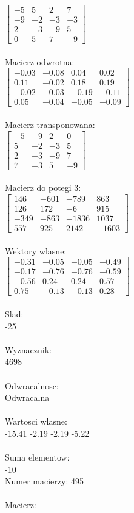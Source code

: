 \documentclass[a4paper,12pt]{article}
\begin{document}
$\begin{bmatrix} -5&5&2&7\\-9&-2&-3&-3\\2&-3&-9&5\\0&5&7&-9 \end{bmatrix}$
\\
\\
Macierz odwrotna:\\

$\begin{bmatrix} -0.03&-0.08&0.04&0.02\\0.11&-0.02&0.18&0.19\\-0.02&-0.03&-0.19&-0.11\\0.05&-0.04&-0.05&-0.09 \end{bmatrix}$
\\
\\
Macierz transponowana:\\

$\begin{bmatrix} -5&-9&2&0\\5&-2&-3&5\\2&-3&-9&7\\7&-3&5&-9 \end{bmatrix}$
\\
\\
Macierz do potegi 3:\\

$\begin{bmatrix} 146&-601&-789&863\\126&172&-6&915\\-349&-863&-1836&1037\\557&925&2142&-1603 \end{bmatrix}$
\\
\\
Wektory wlasne:\\

$\begin{bmatrix} -0.31&-0.05&-0.05&-0.49\\-0.17&-0.76&-0.76&-0.59\\-0.56&0.24&0.24&0.57\\0.75&-0.13&-0.13&0.28 \end{bmatrix}$
\\
\\
Slad:\\
-25
\\
\\
Wyznacznik:\\
4698
\\
\\
Odwracalnosc:\\
Odwracalna
\\
\\
Wartosci wlasne:\\
-15.41 -2.19 -2.19 -5.22
\\
\\
Suma elementow:\\
-10
\\
\newpage
Numer macierzy:
495
\\
\\
Macierz:\\
\end{document}
